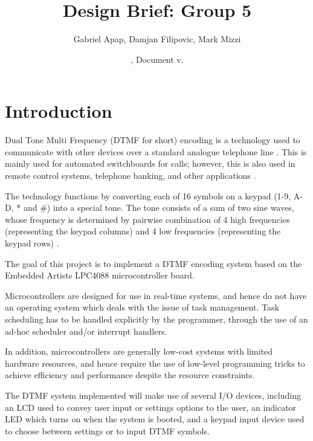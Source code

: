 \documentclass[11pt,a4paper,twocolumn]{scrartcl}
\title{Design Brief: Group 5}
\author{
   Gabriel Apap,
   Damjan Filipovic,
   Mark Mizzi
   }
\date{\svnMaxToday, Document v.\svnInfoMaxRevision}
\begin{document}
\maketitle


\section{Introduction}

   Dual Tone Multi Frequency (DTMF for short) encoding is a technology used to communicate with other devices over a standard analogue telephone line \cite{sl:an218}. This is mainly used for automated switchboards for calls; however, this is also used in remote control systems, telephone banking, and other applications \cite{sl:an218}.

   The technology functions by converting each of 16 symbols on a keypad (1-9, A-D, * and \#) into a special tone. The tone consists of a sum of two sine waves, whose frequency is determined by pairwise combination of 4 high frequencies (representing the keypad columns) and 4 low frequencies (representing the keypad rows) \cite{sl:an218}.

   The goal of this project is to implement a DTMF encoding system based on the Embedded Artists LPC4088 microcontroller board.

   Microcontrollers are designed for use in real-time systems, and hence do not have an operating system which deals with the issue of task management. Task scheduling has to be handled explicitly by the programmer, through the use of an ad-hoc scheduler and/or interrupt handlers.

   In addition, microcontrollers are generally low-cost systems with limited hardware resources, and hence require the use of low-level programming tricks to achieve efficiency and performance despite the resource constraints.
   
   The DTMF system implemented will make use of several I/O devices, including an LCD used to convey user input or settings options to the user,
   an indicator LED which turns on when the system is booted, and a keypad input device used to choose between settings or to input DTMF symbols.
\end{document}
